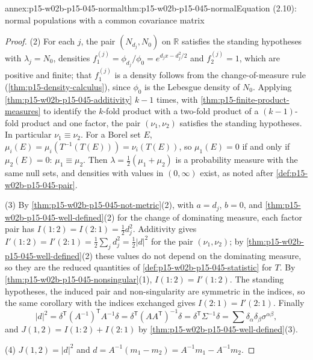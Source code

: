 \begin{annexitem}{annex:p15-w02b-p15-045-normal}{thm:p15-w02b-p15-045-normal}{Equation (2.10): normal populations with a common covariance matrix}
\begin{proof}
(2) For each \(j\), the pair \((N_{d_j},N_0)\) on \(\mathbb R\)
satisfies the standing hypotheses with \(\lambda_j=N_0\), densities
\(f_1^{(j)}=\phi_{d_j}/\phi_0=e^{d_jx-d_j^2/2}\) and \(f_2^{(j)}=1\),
which are positive and finite; that \(f_1^{(j)}\) is a density follows
from the change-of-measure rule (\cref{thm:p15-density-calculus}),
since \(\phi_0\) is the Lebesgue density of \(N_0\). Applying
\cref{thm:p15-w02b-p15-045-additivity} \(k-1\) times, with
\cref{thm:p15-finite-product-measures} to identify the \(k\)-fold
product with a two-fold product of a \((k-1)\)-fold product and one
factor, the pair \((\nu_1,\nu_2)\) satisfies the standing hypotheses.
In particular \(\nu_1\equiv\nu_2\). For a Borel set \(E\),
\(\mu_i(E)=\mu_i(T^{-1}(T(E)))=\nu_i(T(E))\), so \(\mu_1(E)=0\) if and
only if \(\mu_2(E)=0\): \(\mu_1\equiv\mu_2\). Then
\(\lambda=\tfrac12(\mu_1+\mu_2)\) is a probability measure with the same
null sets, and densities with values in \((0,\infty)\) exist, as noted
after \cref{def:p15-w02b-p15-045-pair}.

(3) By \cref{thm:p15-w02b-p15-045-not-metric}(2), with \(a=d_j\),
\(b=0\), and \cref{thm:p15-w02b-p15-045-well-defined}(2) for the change
of dominating measure, each factor pair has \(I(1:2)=I(2:1)=\tfrac12d_j^2\).
Additivity gives \(I'(1:2)=I'(2:1)=\tfrac12\sum_jd_j^2=\tfrac12|d|^2\)
for the pair \((\nu_1,\nu_2)\); by
\cref{thm:p15-w02b-p15-045-well-defined}(2) these values do not depend
on the dominating measure, so they are the reduced quantities of
\cref{def:p15-w02b-p15-045-statistic} for \(T\). By
\cref{thm:p15-w02b-p15-045-nonsingular}(1), \(I(1:2)=I'(1:2)\). The
standing hypotheses, the induced pair and non-singularity are symmetric
in the indices, so the same corollary with the indices exchanged gives
\(I(2:1)=I'(2:1)\). Finally
\[
  |d|^2=\delta^{\mathsf T}(A^{-1})^{\mathsf T}A^{-1}\delta
       =\delta^{\mathsf T}(AA^{\mathsf T})^{-1}\delta
       =\delta^{\mathsf T}\Sigma^{-1}\delta
       =\sum\delta_\alpha\delta_\beta\sigma^{\alpha\beta},
\]
and \(J(1,2)=I(1:2)+I(2:1)\) by
\cref{thm:p15-w02b-p15-045-well-defined}(3).

(4) \(J(1,2)=|d|^2\) and \(d=A^{-1}(m_1-m_2)=A^{-1}m_1-A^{-1}m_2\).
\end{proof}
\end{annexitem}

